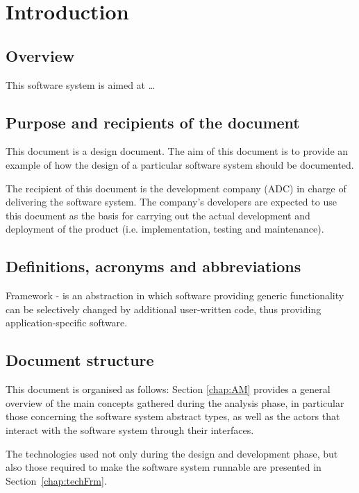 \chapter{Introduction}
\label{chap:introduction}


\section{Overview}
This software system is aimed at \ldots




\section{Purpose and recipients of the document}
This document is a design document. The aim of this document is to provide an
example of how the design of a particular software system should be documented. 

The recipient of this document is the development company (ADC) in charge
of delivering the software system. The company's developers are
expected to use this document as the basis for carrying out the actual
development and deployment of the product (i.e. implementation, testing
and maintenance).





\section{Definitions, acronyms and abbreviations}
Framework - is an abstraction in which software providing generic functionality
can be selectively changed by additional user-written code, thus providing application-specific software.


  
\section{Document structure} 
This document is organised as follows: Section \ref{chap:AM} provides a general
overview of the main concepts gathered during the analysis phase, in particular those concerning the software system abstract
types, as well as the actors that interact with the
software system through their interfaces. 

The technologies used not only during the design and development phase, but 
also those required to make the software system runnable are presented in
Section~\ref{chap:techFrm}.

